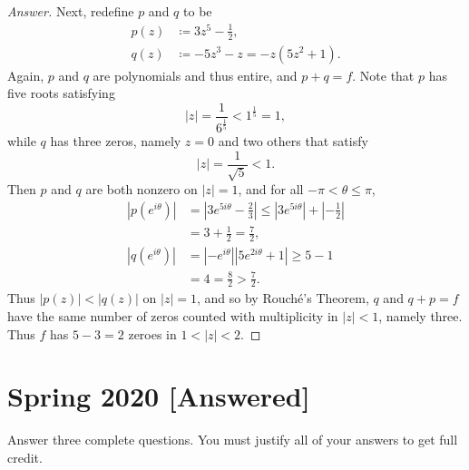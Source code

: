 \documentclass[12pt]{article}
\newcommand\paren[1]{\left( #1 \right)}
\newcommand{\abs}[1]{\left| #1 \right|}
\theoremstyle{definition}
\begin{document}
\begin{proof}[Answer]
    Next, redefine $p$ and $q$ to be 
    \begin{align*}
        p(z) & \coloneqq 3z^5 - \frac{1}{2} , \\ 
        q(z) & \coloneqq -5z^3 - z = -z \paren{ 5z^2 + 1 } . 
    \end{align*}
    Again, $p$ and $q$ are polynomials and thus entire, and $p + q = f$. Note that $p$ has five roots satisfying 
    \[
        \abs{ z } = \frac{1}{6^{\frac{1}{5}}} < 1^{\frac{1}{5}} = 1 , 
    \]
    while $q$ has three zeros, namely $z = 0$ and two others that satisfy
    \[
        \abs{z} = \frac{1}{\sqrt{5}} < 1 .
    \]
    Then $p$ and $q$ are both nonzero on $\abs{z} = 1$, and for all $-\pi < \theta \leq \pi$, 
    \begin{align*}
        \abs{ p \paren{ e^{i\theta} } } & = \abs{ 3 e^{5i\theta} - \frac{2}{3} } \leq \abs{ 3 e^{5i\theta} } + \abs{ -\frac{1}{2} } \\ 
        & = 3 + \frac{1}{2} = \frac{7}{2} , \\ 
        \abs{ q \paren{ e^{i\theta} } } & = \abs{ - e^{i\theta} } \abs{ 5 e^{2i\theta} + 1 } \geq 5 - 1 \\ 
        & = 4 = \frac{8}{2} > \frac{7}{2} . 
    \end{align*}
    Thus $\abs{ p(z) } < \abs{ q(z) }$ on $\abs{z} = 1$, and so by Rouch\'e's Theorem, $q$ and $q + p = f$ have the same number of zeros counted with multiplicity in $\abs{z} < 1$, namely three. Thus $f$ has $5 - 3 = \boxed{2}$ zeroes in $1 < \abs{z} < 2$. 
\end{proof}

\newpage
\section{Spring 2020 [Answered]}
Answer three complete questions. You must justify all of your answers to get full credit.
\end{document}
